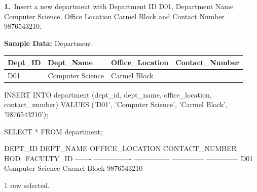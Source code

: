 \noindent\begin{minipage}{\linewidth}
\begingroup{}
{\fontsize{14}{17}\selectfont\textbf{1.}}\ Insert a new department with Department ID D01, Department Name Computer Science, Office Location Carmel Block and Contact Number 9876543210.\par
\endgroup\vspace{12pt}

\noindent\textbf{Sample Data:} Department\par
\vspace{6pt}
{\small\setlength{\tabcolsep}{4pt}
\renewcommand{\arraystretch}{1.25}
\noindent\begin{tabular}{|>{\raggedright\arraybackslash}p{87.6pt}|>{\raggedright\arraybackslash}p{128.2pt}|>{\raggedright\arraybackslash}p{123.0pt}|>{\raggedright\arraybackslash}p{129.1pt}|}
\hline
\textbf{Dept\_ID} & \textbf{Dept\_Name} & \textbf{Office\_Location} & \textbf{Contact\_Number} \\ \hline
D01 & Computer Science & Carmel Block & 9876543210 \\ \hline
\end{tabular}\par}
\vspace{14pt}

\begin{sqlcode}
INSERT INTO department (dept_id, dept_name, office_location, contact_number)
VALUES ('D01', 'Computer Science', 'Carmel Block', '9876543210');

SELECT * FROM department;
\end{sqlcode}

\vspace{18pt}


\begin{sqlout}[fontsize=\small]
DEPT_ID  DEPT_NAME         OFFICE_LOCATION  CONTACT_NUMBER  HOD_FACULTY_ID
-------  ----------------  ---------------  --------------  --------------
D01      Computer Science  Carmel Block     9876543210

1 row selected.
\end{sqlout}
\end{minipage}\par\vspace{24pt}

